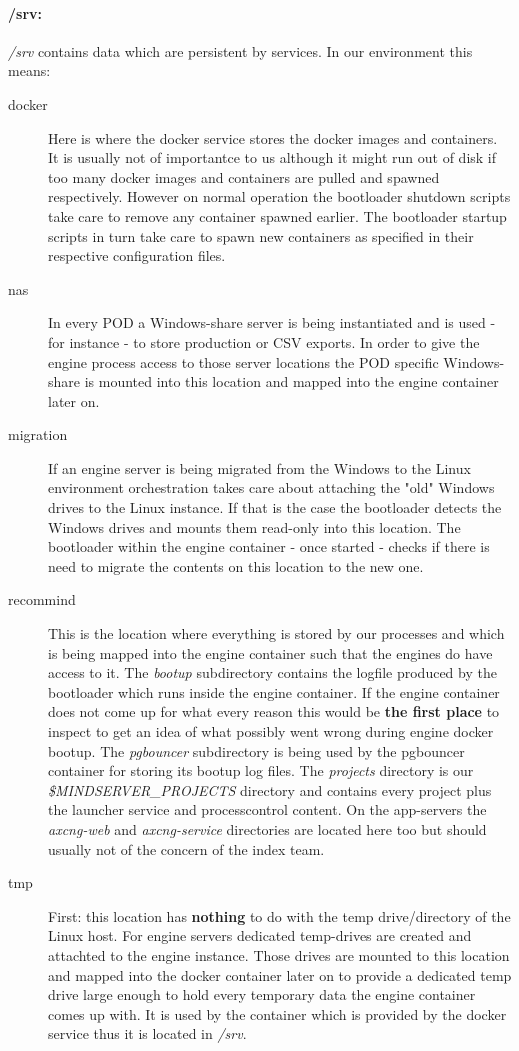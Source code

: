 	\paragraph{/srv:} \emph{/srv} contains data which are persistent by services. In our environment this means:
	\begin{description}
		\item[docker] Here is where the docker service stores the docker images and containers. It is usually not of importantce to us although it might run out of disk if too many docker images and containers are pulled and spawned respectively. However on normal operation the bootloader shutdown scripts take care to remove any container spawned earlier. The bootloader startup scripts in turn take care to spawn new containers as specified in their respective configuration files.
		\item[nas] In every POD a Windows-share server is being instantiated and is used - for instance - to store production or CSV exports. In order to give the engine process access to those server locations the POD specific Windows-share is mounted into this location and mapped into the engine container later on.
		\item[migration] If an engine server is being migrated from the Windows to the Linux environment orchestration takes care about attaching the "old" Windows drives to the Linux instance. If that is the case the bootloader detects the Windows drives and mounts them read-only into this location. The bootloader within the engine container - once started - checks if there is need to migrate the contents on this location to the new one.
		\item[recommind] This is the location where everything is stored by our processes and which is being mapped into the engine container such that the engines do have access to it. The \emph{bootup} subdirectory contains the logfile produced by the bootloader which runs inside the engine container. If the engine container does not come up for what every reason this would be \textbf{the first place} to inspect to get an idea of what possibly went wrong during engine docker bootup. The \emph{pgbouncer} subdirectory is being used by the pgbouncer container for storing its bootup log files. The \emph{projects} directory is our \emph{\$MINDSERVER\_PROJECTS} directory and contains every project plus the launcher service and processcontrol content. On the app-servers the \emph{axcng-web} and \emph{axcng-service} directories are located here too but should usually not of the concern of the index team.
		\item[tmp] First: this location has \textbf{nothing} to do with the temp drive/directory of the Linux host. For engine servers dedicated temp-drives are created and attachted to the engine instance. Those drives are mounted to this location and mapped into the docker container later on to provide a dedicated temp drive large enough to hold every temporary data the engine container comes up with. It is used by the container which is provided by the docker service thus it is located in \emph{/srv}.
	\end{description}
	
